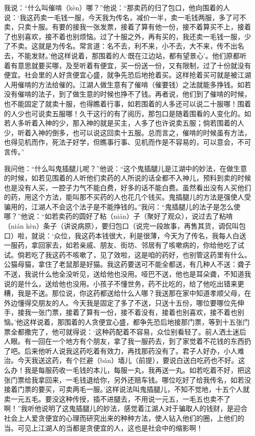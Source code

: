 \documentclass[12pt,UTF8]{ctexbook}
\begin{document}
我说：“什么叫催啃（kèn）哪？”他说：“那卖药的归了包口，他向围着的人说：‘我这药卖一毛钱一服，今天我为传名，减价一半，卖一毛钱两服，多了可不卖，只卖十服。有要的接我一张发票，接着了算有他一份，接不着算买不上，接着了也别喜欢，接不着也别烦恼。过了十服之外，再有买的，我还卖一毛钱一服，少了不卖。这就是为传名。常言道：名不去，利不来，小不去，大不来，传不出名去，不能发财。’他这样说着，那围着的人‘既在江边站，都有望景心’。他们原都听着有意思就要买哪，及至听着有便宜，买一份送一份，又有限制，过了十份就没有便宜。社会里的人好贪便宜心盛，就争先恐后地抢着买。这样抢着买可就是被江湖人用催啃的方法给催的。江湖人做生意有了催啃（催要钱）之法就能多挣钱。如若没有催啃的法子，到了做生意的时候也挣不了钱。再者说，他们到了催啃的时候，也不能固定了就卖十服，也得瞧着行事，如若围着的人多还可以说二十服哪！围着的人少也可说卖五服哪！久干这行的有了阅历，那包口是随着围看的人变化的。如若人多听着入神的少，那入神的就是买主，人多了也许说卖五服；倘若围着的人少，听着入神的倒多，也可以说这回卖十五服。总而言之，催啃的时候虽有方法，也得见机而作，死法子好学，但瞧事行事、见机而作是不容易的，可以意会，不可言传。”

我问他：“什么叫鬼插腿儿呢？”他说：“这个鬼插腿儿是江湖中的妙法，在做生意的时候，如若见围着的人听他们卖药的人所说的话全都不入神儿，预料到卖的时候也是没有人买，一腔子力气不能白费，好多的话不能白费。虽然看出没有人买他们的药，用这个方法，能叫那不买药的人也花几个钱买。鬼插腿儿的方法是强使人受骗用的，江湖人不会这个法子是不能挣钱的。”我问：“鬼插腿儿的法子是怎么使哪？”他说：“如若卖药的圆好了粘（nián）子（聚好了观众），说过去了粘啃（nián kèn）条子（讲说病原），要归包口（说完一段故事，再售其货，调侃叫包口）啦，就说：‘众位，我这药本钱很大，利是很薄，今天为了传名，我每人白送一服药，拿回家去，如若亲戚、朋友、街坊、邻居有了咳嗽病的，你给他吃了试试。倘若吃了我这药不咳嗽了，见了效啦，这是咱的药好，也别管这药里有什么。公猫母猫，拿住了老鼠那是好猫。我这药要送可不能全都送，有几种人不送：聋子不送，我说什么他全没听见，送给他也没用。哑巴不送，他也是耳朵聋，不知道我说的是什么，送给他也没用。小孩子不懂世务，药不比吃的，给了他吃出错来更糟，我是不送。那位说，你这药都送给什么人哪？我送那在家中知道孝顺父母，在外边懂得交朋友的人。今天我是固定了多了不送，只送十五份，哪位要哪位先伸手，接我一张门票，接着了算有一份，接不着没有，接着也别喜欢，接不着也别恼。’他这样说着，那围着的人贪便宜心盛，都争先恐后地接那门票，等到十五张门票全都撒完了，他可就得说：‘这种药配着不容易，众位别看轻了。前人洒土迷后人眼。有一回在一个地方有个朋友，拿了我一服药去，到了家觉着不花钱的东西扔了吧。后来他听人说我这药吃着有效力，再找那药没有了。君子人好办，小人难治。今天我送这药，有个拦避（bǎn）墙儿（前提），要说白送白吃药也不好。这么办！我是每服药收一毛钱的本儿，每服一丸，我再送一丸。如若吃着不好，把这张门票给我拿回来，一毛钱退给你，另外还赔车钱。哪位吃好了给我传名，如若没接着门票的要买，可卖两毛一服。’这样说法叫鬼插腿儿，不知不觉地，十五个人就卖一元五毛。要没这种传授，插不进腿去，不用说一元五，一毛五也卖不了啊！”我听他说明了这鬼插腿儿的妙法，感觉着江湖人对于骗取人的钱财，是迎合社会上人爱贪便宜的心理而研究出来的种种方法，使人钻入他们的圈，上他们的当。可见上江湖人的当都是贪便宜的人，这也是社会中的缩影啊！
\end{document}
